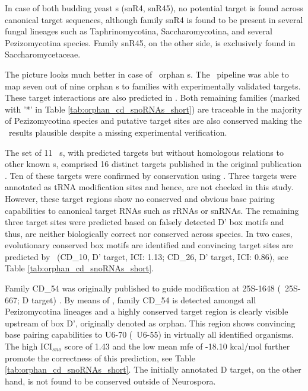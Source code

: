 In case of both budding yeast \sno s (snR4, snR45), no potential target is found
across canonical target sequences, although family snR4 is found to be
present in several fungal lineages such as Taphrinomycotina,
Saccharomycotina, and several Pezizomycotina species. Family snR45, on
the other side, is exclusively found in Saccharomycetaceae.

The picture looks much better in case of \afu\ orphan \sno s. The
\snostrip\ pipeline was able to map seven out of nine orphan \cd s
to families with experimentally validated targets. These target
interactions are also predicted in \afu. Both remaining families
(marked with '*' in Table \ref{tab:orphan_cd_snoRNAs_short}) are
traceable in the majority of Pezizomycotina species and putative
target sites are also conserved making the \snostrip\ results
plausible despite a missing experimental verification.

The set of 11 \ncr\ \sno s, with predicted targets but without homologous
relations to other known \sno s,
comprised 16 distinct targets published in the original publication \cite{Li:2005}.
Ten of these targets were confirmed by conservation using \snostrip.
Three targets were annotated as tRNA modification
sites and hence, are not checked in this study. However, these target
regions show no conserved and obvious base pairing capabilities to
canonical target RNAs such as rRNAs or snRNAs. The remaining three
target sites were predicted based on falsely detected D' box
motifs and thus, are neither biologically correct nor conserved across
species. In two cases, evolutionary conserved box motifs are
identified and convincing target sites are predicted by \snostrip\
(CD\_10, D' target, ICI: 1.13; CD\_26, D' target, ICI: 0.86), see Table
\ref{tab:orphan_cd_snoRNAs_short}.

Family CD\_54 was originally published to guide modification at
25S-1648 (\ncr\ 25S-667; D target) \cite{Liu:2009}. By means of
\snostrip, family CD\_54 is detected amongst all Pezizomycotina lineages and a
highly conserved target region is clearly
visible upstream of box D', originally denoted as orphan. This region shows convincing base pairing capabilities to
U6-70 (\ncr\ U6-55) in virtually all identified organisms. The high
ICI$_{sno}$ score of 1.43 and the low mean mfe of -18.10 kcal/mol
further promote the correctness of this prediction, see Table
\ref{tab:orphan_cd_snoRNAs_short}. The initially
annotated D target, on the other hand, is not found to be conserved outside of Neurospora.\\

